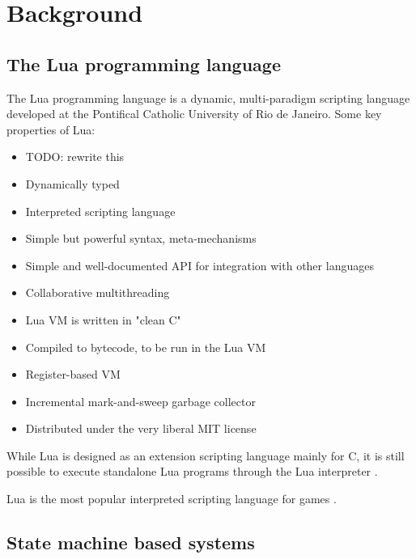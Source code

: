 \chapter{Background}
\label{chp:background}

\section{The Lua programming language}
\label{sec:lua_language}

The Lua programming language is a dynamic, multi-paradigm scripting language developed at the Pontifical Catholic University of Rio de Janeiro. Some key properties of Lua:

\begin{itemize}
	\item TODO: rewrite this
	\item Dynamically typed
	\item Interpreted scripting language
	\item Simple but powerful syntax, meta-mechanisms
	\item Simple and well-documented API for integration with other languages
	\item Collaborative multithreading
	\item Lua VM is written in "clean C"
	\item Compiled to bytecode, to be run in the Lua VM
	\item Register-based VM
	\item Incremental mark-and-sweep garbage collector
	\item Distributed under the very liberal MIT license \cite{website:lua_license}
\end{itemize}

While Lua is designed as an extension scripting language mainly for C, it is still possible to execute standalone Lua programs through the Lua interpreter \cite[ch. 7]{book:lua_reference_manual}.

Lua is the most popular interpreted scripting language for games \cite{website:the_engine_survey}.

\section{State machine based systems}